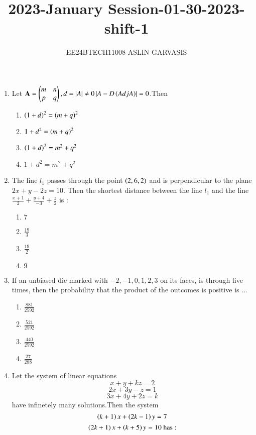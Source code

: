 \documentclass[journal,12pt,twocolumn]{IEEEtran}
\theoremstyle{remark}
\begin{document}

\vspace{3cm}
\title{2023-January Session-01-30-2023-shift-1}
\author{EE24BTECH11008-ASLIN GARVASIS}
\maketitle
\begin{enumerate}
    \item Let $\textbf{A}=\begin{pmatrix}m&n\\p&q\end{pmatrix},d=\left\vert A\right\vert \neq 0 \left\vert A-D\left(Adj A\right)\right\vert=0$.Then\\
    \begin{enumerate}
        \item $\left(1+d\right)^2=\left(m+q\right)^2$
        \item $1+d^2=\left(m+q\right)^2$
        \item $\left(1+d\right)^2=m^2+q^2$
        \item $1+d^2=m^2+q^2$
    \end{enumerate}
    \item The line $l_1$ passes through the point $\left(2,6,2\right)$ and is perpendicular to the plane $2x+y-2z=10.$ Then the shortest distance between the line $l_1$ and the line $\frac{x+1}{2}+\frac{y+4}{-3}+\frac{z}{2}$ is $:$\\
    \begin{enumerate}
        \item $7$
        \item $\frac{19}{3}$
        \item $\frac{19}{2}$
        \item $9$
    \end{enumerate}
    \item If an unbiased die marked with $-2,-1,0,1,2,3$ on its faces, is through five times, then the probability that the product of the outcomes is positive is $\dots$\\
    \begin{enumerate}
        \item $\frac{881}{2592}$
        \item $\frac{521}{2592}$
        \item $\frac{440}{2592}$
        \item $\frac{27}{288}$
    \end{enumerate}
    \item Let the system of linear equations $$x+y+kz=2$$ $$2x+3y-z=1$$ $$3x+4y+2z=k$$ have infinetely many solutions.Then the system $$\left(k+1\right)x+\left(2k-1\right)y=7$$ $$\left(2k+1\right)x+\left(k+5\right)y=10 \text{ has}:$$

\end{enumerate}
\end{document}
